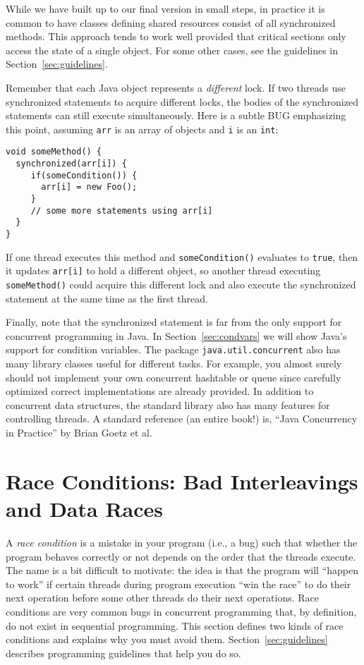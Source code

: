 \documentclass[10pt]{article}
\begin{document}
While we have built up to our final version in small steps, in
practice it is common to have classes defining shared resources
consist of all synchronized methods.  This approach tends to work well
provided that critical sections only access the state of a single
object.  For some other cases, see the guidelines in
Section~\ref{sec:guidelines}.

Remember that each Java object represents a \emph{different} lock.  If
two threads use synchronized statements to acquire different locks,
the bodies of the synchronized statements can still execute
simultaneously.  Here is a subtle BUG emphasizing this point, assuming
{\tt arr} is an array of objects and {\tt i} is an {\tt int}:
\begin{verbatim}
void someMethod() {
  synchronized(arr[i]) {
     if(someCondition()) {
       arr[i] = new Foo();
     }
     // some more statements using arr[i]
  }
}
\end{verbatim}
If one thread executes this method and {\tt someCondition()} evaluates
to {\tt true}, then it updates {\tt arr[i]} to hold a different
object, so another thread executing {\tt someMethod()} could acquire
this different lock and also execute the synchronized statement at the same
time as the first thread.

Finally, note that the synchronized statement is far from the only
support for concurrent programming in Java.  In
Section~\ref{sec:condvars} we will show Java's support for condition
variables.  The package {\tt java.util.concurrent} also has many
library classes useful for different tasks.  For example, you almost
surely should not implement your own concurrent hashtable or queue
since carefully optimized correct implementations are already
provided.  In addition to concurrent data structures, the standard
library also has many features for controlling threads.  A standard
reference (an entire book!) is, ``Java Concurrency in Practice'' by
Brian Goetz et al.

\section{Race Conditions: Bad Interleavings and Data Races}
\label{sec:races}

A \emph{race condition} is a mistake in your program (i.e., a bug)
such that whether the program behaves correctly or not depends on the
order that the threads execute.  The name is a bit difficult to
motivate: the idea is that the program will ``happen to work'' if
certain threads during program execution ``win the race'' to do their
next operation before some other threads do their next operations.
Race conditions are very common bugs in concurrent programming that,
by definition, do not exist in sequential programming.  This section
defines two kinds of race conditions and explains why you must avoid
them.  Section~\ref{sec:guidelines} describes programming guidelines
that help you do so.
\end{document}
